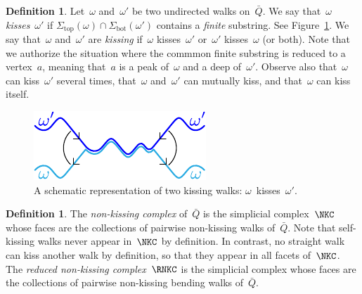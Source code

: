 \documentclass{amsart}
\theoremstyle{definition}
\newtheorem{definition}[theorem]{Definition}
\newcommand{\set}[2]{\left\{ #1 \;\middle|\; #2 \right\}} %
\newcommand{\eqdef}{\mbox{\,\raisebox{0.2ex}{\scriptsize\ensuremath{\mathrm:}}\ensuremath{=}\,}} %
\newcommand{\fref}[1]{Figure~\ref{#1}} %
\newcommand{\ie}{\textit{i.e.}~} %
\newcommand{\darkblue}{\color{darkblue}} %
\newcommand{\defn}[1]{\textsl{\darkblue #1}} %
\renewcommand{\top}{\mathrm{top}} %
\newcommand{\bottom}{\mathrm{bot}} %
\begin{document}
\begin{definition}%
\label{def:kiss}
Let~$\omega$ and~$\omega'$ be two undirected walks on~$\bar Q$.
We say that~$\omega$ \defn{kisses}~$\omega'$ if ${\Sigma_\top(\omega) \cap \Sigma_\bottom(\omega')}$ contains a \emph{finite} substring.
See \fref{fig:kissing}.
We say that~$\omega$ and~$\omega'$ are \defn{kissing} if~$\omega$ kisses~$\omega'$ or~$\omega'$ kisses~$\omega$ (or both).
Note that we authorize the situation where the commmon finite substring is reduced to a vertex~$a$, meaning that~$a$ is a peak of~$\omega$ and a deep of~$\omega'$.
Observe also that~$\omega$ can kiss~$\omega'$ several times, that~$\omega$ and~$\omega'$ can mutually kiss, and that~$\omega$ can kiss itself.
%
\begin{figure}[h]
	\capstart
	\centerline{\includegraphics[scale=1]{kissing}}
	\caption{A schematic representation of two kissing walks: $\omega$~kisses~$\omega'$.}
	\label{fig:kissing}
\end{figure}
%
\end{definition}

\begin{definition}%
\label{def:nKc}
The \defn{non-kissing complex} of~$\bar Q$ is the simplicial complex~$\NKC$ whose faces are the collections of pairwise non-kissing walks of~$\bar Q$.
Note that self-kissing walks never appear in~$\NKC$ by definition.
In contrast, no straight walk can kiss another walk by definition, so that they appear in all facets of~$\NKC$.
The \defn{reduced non-kissing complex}~$\RNKC$ is the simplicial complex whose faces are the collections of pairwise non-kissing bending walks of~$\bar Q$.
\end{definition}
\end{document}
